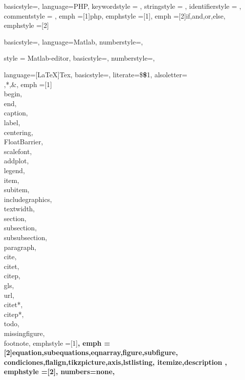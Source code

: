 	{
	basicstyle=\scriptsize,
	language=PHP,
	keywordstyle    = \color{dkblue},
  	stringstyle     = \color{red},
  	identifierstyle = \color{dkgreen},
  	commentstyle    = \color{gray},
  	emph            =[1]{php},
  	emphstyle       =[1]\color{black},
  	emph            =[2]{if,and,or,else},
  	emphstyle       =[2]\color{dkyellow}
  }
  
	{
	basicstyle=\scriptsize,
	language=Matlab,
	numberstyle=\tiny\ttfamily\color{gray75},
	}
	
	{
	style = Matlab-editor,
	basicstyle=\scriptsize,
	numberstyle=\tiny\ttfamily\color{gray75},
	}
	
	{
	language=[LaTeX]{Tex},
    basicstyle=\scriptsize,
    literate={\$}{{{\bfseries\$}}}1,
    alsoletter={\\,*,\&},
    emph =[1]{\\begin,\\end,\\caption,\\label,\\centering,\\FloatBarrier,
              \,\\scalefont,\\addplot,\,
              \\legend,\\item,\\subitem,\\includegraphics,\\textwidth,
              \\section,\\subsection,\\subsubsection,\\paragraph,
              \\cite,\\citet,\\citep,\\gls,\,\\url,
              \\citet*,\\citep*,\\todo,\\missingfigure,\\footnote},
  	emphstyle =[1]\bfseries,
  	emph = [2]{equation,subequations,eqnarray,figure,subfigure,
  			   condiciones,flalign,tikzpicture,axis,lstlisting,
  			   itemize,description
  			   },
  	emphstyle =[2]\bfseries,
    numbers=none,
	}
	
